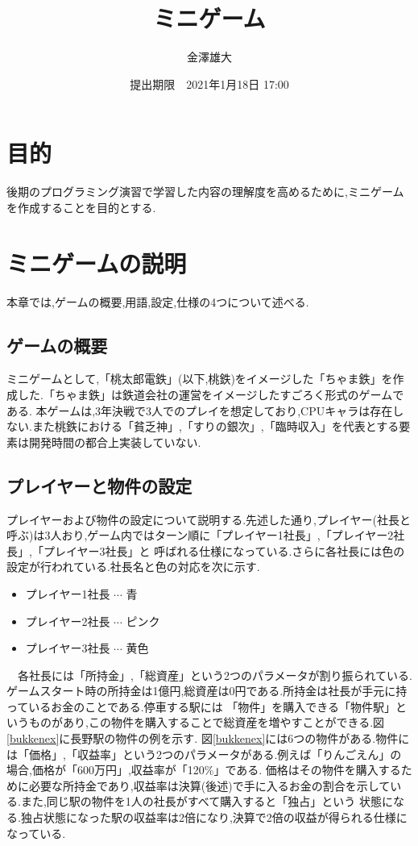 \documentclass[a4j]{jarticle}
\title{ミニゲーム}
\date{提出期限　2021年1月18日 17:00}
\author{金澤雄大}
\begin{document}
    \maketitle
    \thispagestyle{empty}
    \clearpage
    \addtocounter{page}{-1}
    \section{目的}
    後期のプログラミング演習で学習した内容の理解度を高めるために,ミニゲームを作成することを目的とする.
    \section{ミニゲームの説明}
    本章では,ゲームの概要,用語,設定,仕様の4つについて述べる.
    \subsection{ゲームの概要}
    ミニゲームとして,「桃太郎電鉄」\cite{mmtt}(以下,桃鉄)をイメージした「ちゃま鉄」を作成した.「ちゃま鉄」は鉄道会社の運営をイメージしたすごろく形式のゲームである.
    本ゲームは,3年決戦で3人でのプレイを想定しており,CPUキャラは存在しない.また桃鉄における「貧乏神」,「すりの銀次」,「臨時収入」を代表とする要素は開発時間の都合上実装していない.
    \subsection{プレイヤーと物件の設定}
    プレイヤーおよび物件の設定について説明する.先述した通り,プレイヤー(社長と呼ぶ)は3人おり,ゲーム内ではターン順に「プレイヤー1社長」,「プレイヤー2社長」,「プレイヤー3社長」と
    呼ばれる仕様になっている.さらに各社長には色の設定が行われている.社長名と色の対応を次に示す.
    \begin{itemize}
        \item プレイヤー1社長 $\cdots$ 青
        \item プレイヤー2社長 $\cdots$ ピンク
        \item プレイヤー3社長 $\cdots$ 黄色
      \end{itemize}
      　各社長には「所持金」,「総資産」という2つのパラメータが割り振られている.ゲームスタート時の所持金は1億円,総資産は0円である.所持金は社長が手元に持っているお金のことである.停車する駅には
      「物件」を購入できる「物件駅」というものがあり,この物件を購入することで総資産を増やすことができる.図\ref{bukkenex}に長野駅の物件の例を示す.
      図\ref{bukkenex}には6つの物件がある.物件には「価格」,「収益率」という2つのパラメータがある.例えば「りんごえん」の場合,価格が「600万円」,収益率が「120\%」である.
      価格はその物件を購入するために必要な所持金であり,収益率は決算(後述)で手に入るお金の割合を示している.また,同じ駅の物件を1人の社長がすべて購入すると「独占」という
      状態になる.独占状態になった駅の収益率は2倍になり,決算で2倍の収益が得られる仕様になっている.
\end{document}
